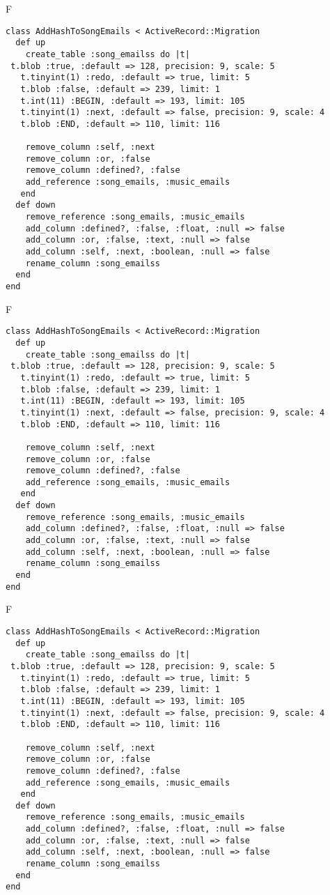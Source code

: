 F
\begin{verbatim}
class AddHashToSongEmails < ActiveRecord::Migration
  def up
    create_table :song_emailss do |t| 
 t.blob :true, :default => 128, precision: 9, scale: 5
   t.tinyint(1) :redo, :default => true, limit: 5
   t.blob :false, :default => 239, limit: 1
   t.int(11) :BEGIN, :default => 193, limit: 105
   t.tinyint(1) :next, :default => false, precision: 9, scale: 4
   t.blob :END, :default => 110, limit: 116

    remove_column :self, :next
    remove_column :or, :false
    remove_column :defined?, :false
    add_reference :song_emails, :music_emails
   end
  def down
    remove_reference :song_emails, :music_emails
    add_column :defined?, :false, :float, :null => false
    add_column :or, :false, :text, :null => false
    add_column :self, :next, :boolean, :null => false
    rename_column :song_emailss
  end
end
\end{verbatim}

F
\begin{verbatim}
class AddHashToSongEmails < ActiveRecord::Migration
  def up
    create_table :song_emailss do |t| 
 t.blob :true, :default => 128, precision: 9, scale: 5
   t.tinyint(1) :redo, :default => true, limit: 5
   t.blob :false, :default => 239, limit: 1
   t.int(11) :BEGIN, :default => 193, limit: 105
   t.tinyint(1) :next, :default => false, precision: 9, scale: 4
   t.blob :END, :default => 110, limit: 116

    remove_column :self, :next
    remove_column :or, :false
    remove_column :defined?, :false
    add_reference :song_emails, :music_emails
   end
  def down
    remove_reference :song_emails, :music_emails
    add_column :defined?, :false, :float, :null => false
    add_column :or, :false, :text, :null => false
    add_column :self, :next, :boolean, :null => false
    rename_column :song_emailss
  end
end
\end{verbatim}

F
\begin{verbatim}
class AddHashToSongEmails < ActiveRecord::Migration
  def up
    create_table :song_emailss do |t| 
 t.blob :true, :default => 128, precision: 9, scale: 5
   t.tinyint(1) :redo, :default => true, limit: 5
   t.blob :false, :default => 239, limit: 1
   t.int(11) :BEGIN, :default => 193, limit: 105
   t.tinyint(1) :next, :default => false, precision: 9, scale: 4
   t.blob :END, :default => 110, limit: 116

    remove_column :self, :next
    remove_column :or, :false
    remove_column :defined?, :false
    add_reference :song_emails, :music_emails
   end
  def down
    remove_reference :song_emails, :music_emails
    add_column :defined?, :false, :float, :null => false
    add_column :or, :false, :text, :null => false
    add_column :self, :next, :boolean, :null => false
    rename_column :song_emailss
  end
end
\end{verbatim}

